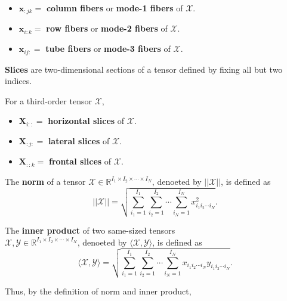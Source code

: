 \documentclass[preprint]{elsarticle}
\begin{document}
\begin{itemize}
    \item $\mathbf{x}_{:jk}=$ \textbf{column fibers} or \textbf{mode-1 fibers}  of $\boldsymbol{\mathscr{X}}$.
    \item $\mathbf{x}_{i:k}=$ \textbf{row fibers} or \textbf{mode-2 fibers}  of $\boldsymbol{\mathscr{X}}$.
    \item $\mathbf{x}_{ij:}=$ \textbf{tube fibers} or \textbf{mode-3 fibers}  of $\boldsymbol{\mathscr{X}}$.
\end{itemize}
\begin{defn}
    \textbf{Slices} are two-dimensional sections of a tensor defined by fixing all but two indices.
\end{defn}
For a third-order tensor $\boldsymbol{\mathscr{X}}$,
\begin{itemize}
    \item $\mathbf{X}_{i::}=$ \textbf{horizontal slices} of $\boldsymbol{\mathscr{X}}$.
    \item $\mathbf{X}_{:j:}=$ \textbf{lateral slices} of $\boldsymbol{\mathscr{X}}$.
    \item $\mathbf{X}_{::k}=$ \textbf{frontal slices} of $\boldsymbol{\mathscr{X}}$.
\end{itemize}
\begin{defn}
    The \textbf{norm} of a tensor $\boldsymbol{\mathscr{X}}\in\mathbb{R}^{I_1\times I_2\times\cdots\times I_N}$,
    denoeted by $||\boldsymbol{\mathscr{X}}||$, is defined as
    \begin{equation}
        ||\boldsymbol{\mathscr{X}}||=\sqrt{\sum_{i_1=1}^{I_1}\sum_{i_2=1}^{I_2}\cdots\sum_{i_N=1}^{I_N}x_{i_1i_2\cdots i_N}^2}.
    \end{equation}
\end{defn}
\begin{defn}
    The \textbf{inner product} of two same-sized tensors\\
    $\boldsymbol{\mathscr{X}},\boldsymbol{\mathscr{Y}}\in\mathbb{R}^{I_1\times I_2\times\cdots\times I_N}$,
    denoeted by $\langle\boldsymbol{\mathscr{X}},\boldsymbol{\mathscr{Y}}\rangle$, is defined as
    \begin{equation}
        \langle\boldsymbol{\mathscr{X}},\boldsymbol{\mathscr{Y}}\rangle=\sqrt{\sum_{i_1=1}^{I_1}\sum_{i_2=1}^{I_2}\cdots\sum_{i_N=1}^{I_N}x_{i_1i_2\cdots i_N}y_{i_1i_2\cdots i_N}}.
    \end{equation}
\end{defn}
Thus, by the definition of norm and inner product,
\end{document}
